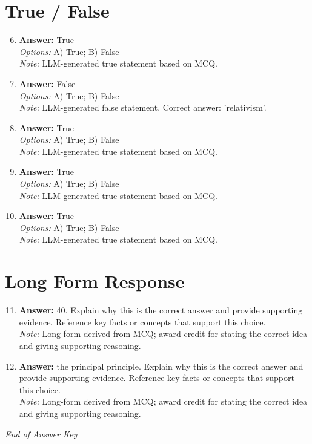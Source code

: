 \documentclass[12pt]{article}
\begin{document}
\section*{True / False}
\begin{enumerate}[label=\arabic*.]
\setcounter{enumi}{5}
\item \textbf{Answer:} True
\\ \textit{Options:} A) True; B) False
\\ \textit{Note:} LLM-generated true statement based on MCQ.
\item \textbf{Answer:} False
\\ \textit{Options:} A) True; B) False
\\ \textit{Note:} LLM-generated false statement. Correct answer: 'relativism'.
\item \textbf{Answer:} True
\\ \textit{Options:} A) True; B) False
\\ \textit{Note:} LLM-generated true statement based on MCQ.
\item \textbf{Answer:} True
\\ \textit{Options:} A) True; B) False
\\ \textit{Note:} LLM-generated true statement based on MCQ.
\item \textbf{Answer:} True
\\ \textit{Options:} A) True; B) False
\\ \textit{Note:} LLM-generated true statement based on MCQ.
\end{enumerate}

\section*{Long Form Response}
\begin{enumerate}[label=\arabic*.]
\setcounter{enumi}{10}
\item \textbf{Answer:} 40. Explain why this is the correct answer and provide supporting evidence. Reference key facts or concepts that support this choice.
\\ \textit{Note:} Long-form derived from MCQ; award credit for stating the correct idea and giving supporting reasoning.
\item \textbf{Answer:} the principal principle. Explain why this is the correct answer and provide supporting evidence. Reference key facts or concepts that support this choice.
\\ \textit{Note:} Long-form derived from MCQ; award credit for stating the correct idea and giving supporting reasoning.
\end{enumerate}

\vfill
\noindent\textit{End of Answer Key}
\end{document}
